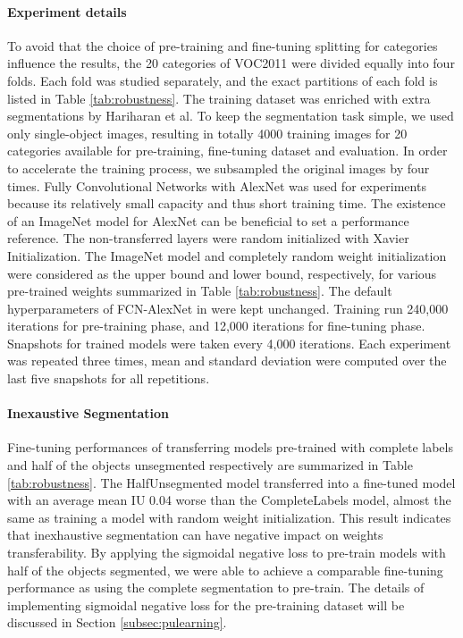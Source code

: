 \paragraph{Experiment details}
To avoid that the choice of pre-training and fine-tuning splitting for categories influence the results, the 20 categories of VOC2011 were divided equally into four folds.
Each fold was studied separately, and the exact partitions of each fold is listed in Table \ref{tab:robustness}.
The training dataset was enriched with extra segmentations by Hariharan et al.\cite{hariharan2011semantic}
To keep the segmentation task simple, we used only single-object images, resulting in totally 4000 training images for 20 categories available for pre-training, fine-tuning dataset and evaluation.
In order to accelerate the training process, we subsampled the original images by four times.
Fully Convolutional Networks with AlexNet was used for experiments because its relatively small capacity and thus short training time.
The existence of an ImageNet model for AlexNet can be beneficial to set a performance reference.
The non-transferred layers were random initialized with Xavier Initialization.
The ImageNet model and completely random weight initialization were considered as the upper bound and lower bound, respectively, for various pre-trained weights summarized in Table \ref{tab:robustness}.
The default hyperparameters of FCN-AlexNet in \cite{long2015fully} were kept unchanged.
Training run 240,000 iterations for pre-training phase, and 12,000 iterations for fine-tuning phase.
Snapshots for trained models were taken every 4,000 iterations.
Each experiment was repeated three times, mean and standard deviation were computed over the last five snapshots for all repetitions.




\paragraph{Inexaustive Segmentation}
Fine-tuning performances of transferring models pre-trained with complete labels and half of the objects unsegmented respectively are summarized in Table \ref{tab:robustness}.
The HalfUnsegmented model transferred into a fine-tuned model with an average mean IU 0.04 worse than the CompleteLabels model, almost the same as training a model with random weight initialization.
This result indicates that inexhaustive segmentation can have negative impact on weights transferability.
By applying the sigmoidal negative loss to pre-train models with half of the objects segmented, we were able to achieve a comparable fine-tuning performance as using the complete segmentation to pre-train.
The details of implementing sigmoidal negative loss for the pre-training dataset will be discussed in Section \ref{subsec:pulearning}.

